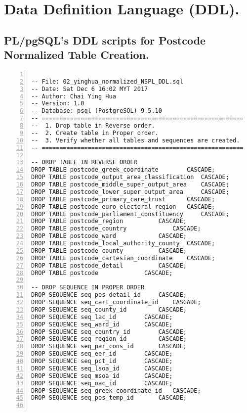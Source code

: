 \chapter{Data Definition Language (DDL).} 
\label{AppendixM} 


\section{PL/pgSQL's DDL scripts for Postcode Normalized Table Creation.}
\lstset{basicstyle=\ttfamily\tiny}  
\begin{lstlisting}[breaklines, frame=single, numbers=left, caption={PL/pgSQL's DDL scripts for Postcode Normalized Table Creation.}, label=commandline-02]

-- File: 02_yinghua_normalized_NSPL_DDL.sql
-- Date: Sat Dec 6 16:02 MYT 2017
-- Author: Chai Ying Hua 
-- Version: 1.0 
-- Database: psql (PostgreSQL) 9.5.10
-- =========================================================
--  1. Drop table in Reverse order. 
--  2. Create table in Proper order. 
--  3. Verify whether all tables and sequences are created. 
-- =========================================================

-- DROP TABLE IN REVERSE ORDER 
DROP TABLE postcode_greek_coordinate 		CASCADE; 
DROP TABLE postcode_output_area_classification  CASCADE; 
DROP TABLE postcode_middle_super_output_area 	CASCADE; 
DROP TABLE postcode_lower_super_output_area 	CASCADE; 
DROP TABLE postcode_primary_care_trust 		CASCADE; 
DROP TABLE postcode_euro_electoral_region 	CASCADE; 
DROP TABLE postcode_parliament_constituency 	CASCADE; 
DROP TABLE postcode_region 			CASCADE; 
DROP TABLE postcode_country 			CASCADE;
DROP TABLE postcode_ward 			CASCADE; 
DROP TABLE postcode_local_authority_county 	CASCADE;
DROP TABLE postcode_county 			CASCADE;
DROP TABLE postcode_cartesian_coordinate 	CASCADE;
DROP TABLE postcode_detail	 		CASCADE;
DROP TABLE postcode	 			CASCADE;

-- DROP SEQUENCE IN PROPER ORDER 
DROP SEQUENCE seq_pos_detail_id 	CASCADE;
DROP SEQUENCE seq_cart_coordinate_id 	CASCADE;
DROP SEQUENCE seq_county_id 		CASCADE;
DROP SEQUENCE seq_lac_id 		CASCADE;
DROP SEQUENCE seq_ward_id 		CASCADE;
DROP SEQUENCE seq_country_id 		CASCADE;
DROP SEQUENCE seq_region_id 		CASCADE;
DROP SEQUENCE seq_par_cons_id 		CASCADE;
DROP SEQUENCE seq_eer_id 		CASCADE;
DROP SEQUENCE seq_pct_id 		CASCADE;
DROP SEQUENCE seq_lsoa_id 		CASCADE;
DROP SEQUENCE seq_msoa_id 		CASCADE;
DROP SEQUENCE seq_oac_id 		CASCADE;
DROP SEQUENCE seq_greek_coordinate_id 	CASCADE;
DROP SEQUENCE seq_pos_temp_id 		CASCADE;


\end{lstlisting}
